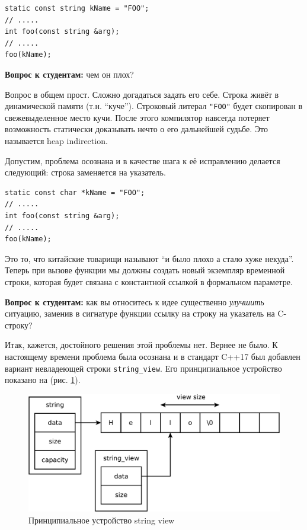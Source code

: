 \documentclass[a4paper,12pt,oneside]{article}
\newif\ifanswers
\begin{document}
\begin{lstlisting}
static const string kName = "FOO";
// .....
int foo(const string &arg);
// .....
foo(kName);
\end{lstlisting}

\textbf{Вопрос к студентам:} чем он плох?

\ifanswers
Ответ ниже.
\fi

Вопрос в общем прост. Сложно догадаться задать его себе. Строка живёт в динамической памяти (т.н. ``куче''). Строковый литерал \lstinline!"FOO"! будет скопирован в свежевыделенное место кучи. После этого компилятор навсегда потеряет возможность статически доказывать нечто о его дальнейшей судьбе. Это называется heap indirection.

Допустим, проблема осознана и в качестве шага к её исправлению делается следующий: строка заменяется на указатель.

\begin{lstlisting}
static const char *kName = "FOO";
// .....
int foo(const string &arg);
// .....
foo(kName);
\end{lstlisting}

Это то, что китайские товарищи называют ``и было плохо а стало хуже некуда''. Теперь при вызове функции мы должны создать новый экземпляр временной строки, которая будет связана с константной ссылкой в формальном параметре.

\textbf{Вопрос к студентам:} как вы относитесь к идее существенно \textit{улучшить} ситуацию, заменив в сигнатуре функции ссылку на строку на указатель на C-строку?

\ifanswers
Правильный ответ: общий смех. Если найдётся несчастный, который согласится с тем, что это хорошая идея, его запинают его же одногруппники
\fi

Итак, кажется, достойного решения этой проблемы нет. Вернее не было. К настоящему времени проблема была осознана и в стандарт C++17 был добавлен вариант невладеющей строки \lstinline!string_view!. Его принципиальное устройство показано на (рис. \ref{fig:stringview-principal}).

\begin{figure}[ht]
\centering
\includegraphics[width=1.0\textwidth]{illustrations/stringview-principal-crop.pdf}
\caption{Принципиальное устройство string view}
\label{fig:stringview-principal}
\end{figure}
\end{document}
